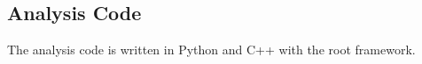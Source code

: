 \subsection{Analysis Code}
\label{sec:APPENDIX_SOFTWARE_CODE}

The analysis code is written in Python and C++ with the \gls{root} framework.
